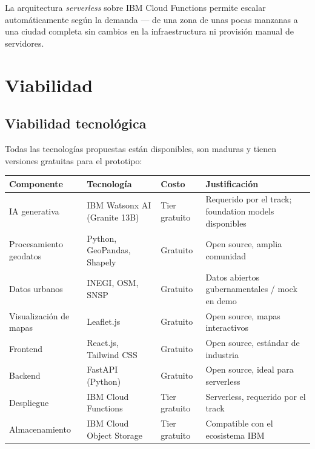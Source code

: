 \documentclass[12pt,a4paper]{article}
\begin{document}
La arquitectura \textit{serverless} sobre IBM Cloud Functions permite escalar automáticamente según la demanda — de una zona de unas pocas manzanas a una ciudad completa sin cambios en la infraestructura ni provisión manual de servidores.


\newpage
\section{Viabilidad}

\subsection{Viabilidad tecnológica}

Todas las tecnologías propuestas están disponibles, son maduras y tienen versiones gratuitas para el prototipo:

\begin{table}[H]
\centering
\small
\renewcommand{\arraystretch}{1.3}
\begin{tabularx}{\textwidth}{l l l X}
\toprule
\rowcolor{azuloscuro}
\color{white}\textbf{Componente} & \color{white}\textbf{Tecnología} & \color{white}\textbf{Costo} & \color{white}\textbf{Justificación} \\
\midrule
IA generativa & IBM Watsonx AI (Granite 13B) & Tier gratuito & Requerido por el track; foundation models disponibles \\
\rowcolor{fondoazul}
Procesamiento geodatos & Python, GeoPandas, Shapely & Gratuito & Open source, amplia comunidad \\
Datos urbanos & INEGI, OSM, SNSP & Gratuito & Datos abiertos gubernamentales / mock en demo \\
\rowcolor{fondoazul}
Visualización de mapas & Leaflet.js & Gratuito & Open source, mapas interactivos \\
Frontend & React.js, Tailwind CSS & Gratuito & Open source, estándar de industria \\
\rowcolor{fondoazul}
Backend & FastAPI (Python) & Gratuito & Open source, ideal para serverless \\
Despliegue & IBM Cloud Functions & Tier gratuito & Serverless, requerido por el track \\
\rowcolor{fondoazul}
Almacenamiento & IBM Cloud Object Storage & Tier gratuito & Compatible con el ecosistema IBM \\
\bottomrule
\end{tabularx}
\end{table}
\end{document}
